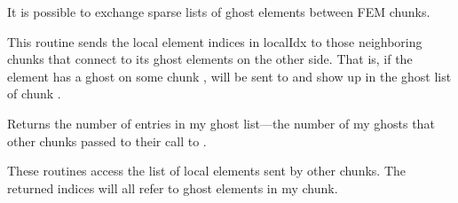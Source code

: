 \documentclass[10pt]{article}
\begin{document}
It is possible to exchange sparse lists of ghost elements between FEM chunks.


This routine sends the local element indices in localIdx to those neighboring chunks that connect to its ghost elements on the other side.  That is, if the element
 has a ghost on some chunk ,  will be sent to 
and show up in the ghost list of chunk .

Returns the number of entries in my ghost list---the number of my ghosts that
other chunks passed to their call to .


These routines access the list of local elements sent by other chunks.  
The returned indices will all refer to ghost elements in my chunk.



%   



\end{document}
